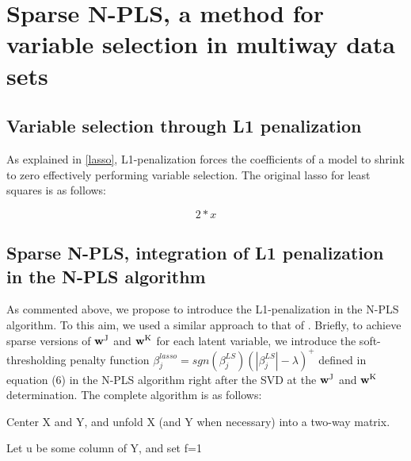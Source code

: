 
\chapter[Sparse N-PLS, a method for variable selection in multiway data sets]{Sparse N-PLS, a method for variable selection in multiway data sets}



\section{Variable selection through L1 penalization}
As explained in \autoref{lasso}, L1-penalization forces the coefficients of a model to shrink to zero effectively performing variable selection. The original lasso for least squares is as follows:

\begin{equation}
2*x
\end{equation}

\section{Sparse N-PLS, integration of L1 penalization in the N-PLS algorithm}
\label{NPLSpenalization}
As commented above, we propose to introduce the L1-penalization in the N-PLS algorithm. To this aim, we used a similar approach to that of \cite{le2008sparse}. Briefly, to achieve sparse versions of $\textbf{\text{w}}^\text{J}$ and $\textbf{\text{w}}^\text{K}$ for each latent variable, we introduce the soft-thresholding penalty function $\beta_j^{lasso}=sgn(\beta_j^{LS})(|\beta_j^{LS}|-\lambda)^+$  defined in equation (6) in the N-PLS algorithm right after the SVD at the $\textbf{\text{w}}^\text{J}$ and $\textbf{\text{w}}^\text{K}$ determination. The complete algorithm is as follows:


\vspace{20pt}
Center X and Y, and unfold X (and Y when necessary) into a two-way matrix.

Let u be some column of Y, and set  f=1

